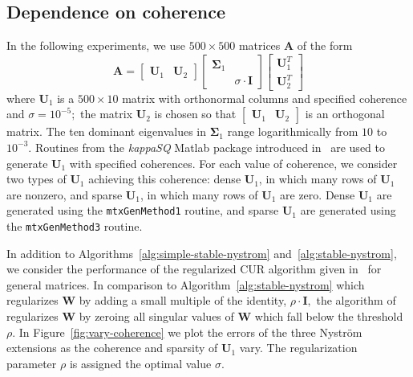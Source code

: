 \documentclass[11pt,letterpaper,twoside,reqno,nosumlimits]{amsart}
\def\transp{T}
\newcommand{\mat}[1]{\ensuremath{\mathbf{#1}}}
\theoremstyle{remark}
\begin{document}
\subsection{Dependence on coherence}
In the following experiments, we use $500 \times 500$ matrices $\mat{A}$ of the form
\begin{equation}
\mat{A} = [\begin{matrix} \mat{U}_1 & \mat{U}_2 \end{matrix}] 
 \left[ \begin{matrix} \mat{\Sigma}_1 & \\ & \sigma \cdot \mat{I} \end{matrix} \right]
 \left[ \begin{matrix} \mat{U}_1^\transp \\ \mat{U}_2^\transp \end{matrix} \right]
 \label{eqn:coherenceA}
\end{equation}
where $\mat{U}_1$ is a $500 \times 10$ matrix with orthonormal columns and specified coherence and $\sigma = 10^{-5};$ the matrix $\mat{U}_2$ is chosen so that $[\begin{matrix} \mat{U}_1 & \mat{U}_2 \end{matrix}]$ is an orthogonal matrix.
The ten dominant eigenvalues in $\mat{\Sigma}_1$ range logarithmically from $10$ to $10^{-3}.$ Routines from the \textit{kappaSQ} Matlab package introduced in~\cite{IW12} are used to generate $\mat{U}_1$ with specified coherences. For each value of coherence, we consider two types of $\mat{U}_1$ achieving this coherence: dense $\mat{U}_1$, in which many rows of $\mat{U}_1$ are nonzero, and sparse $\mat{U}_1$, in which many rows of $\mat{U}_1$ are zero. Dense $\mat{U}_1$ are generated using the \texttt{mtxGenMethod1} routine, and sparse $\mat{U}_1$ are generated using the \texttt{mtxGenMethod3} routine.

In addition to Algorithms~\ref{alg:simple-stable-nystrom} and~\ref{alg:stable-nystrom}, we consider the performance of the regularized CUR algorithm given in~\cite{CD11} for general matrices. In comparison to Algorithm~\ref{alg:stable-nystrom} which regularizes $\mat{W}$ by adding a small multiple of the identity, $\rho \cdot \mat{I},$ the algorithm of~\cite{CD11} regularizes $\mat{W}$ by zeroing all singular values of $\mat{W}$ which fall below the threshold $\rho.$ In Figure~\ref{fig:vary-coherence} we plot the errors of the three Nystr\"om extensions as the coherence and sparsity of $\mat{U}_1$ vary.
The regularization parameter $\rho$ is assigned the optimal value $\sigma.$
\end{document}
